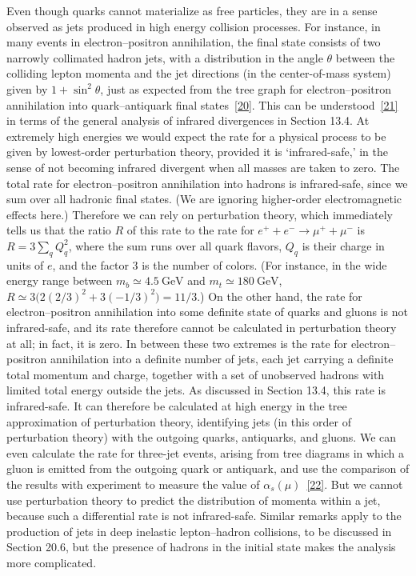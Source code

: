 Even though quarks cannot materialize as free particles, they are in a sense observed as jets produced in high energy collision processes. For instance, in many events in electron--positron annihilation, the final state consists of two narrowly collimated hadron jets, with a distribution in the angle $\theta$ between the colliding lepton momenta and the jet directions (in the center-of-mass system) given by $1+\sin^2\theta$, just as expected from the tree graph for electron--positron annihilation into quark--antiquark final states~\hyperref[ch18-ref-20]{[20]}. This can be understood~\hyperref[ch18-ref-21]{[21]} in terms of the general analysis of infrared divergences in Section 13.4. At extremely high energies we would expect the rate for a physical process to be given by lowest-order perturbation theory, provided it is `infrared-safe,' in the sense of not becoming infrared divergent when all masses are taken to zero. The total rate for electron--positron annihilation into hadrons is infrared-safe, since we sum over all hadronic final states. (We are ignoring higher-order electromagnetic effects here.) Therefore we can rely on perturbation theory, which immediately tells us that the ratio $R$ of this rate to the rate for $e^++e^-\to\mu^++\mu^-$ is $R=3\sum_q Q_q^2$, where the sum runs over all quark flavors, $Q_q$ is their charge in units of $e$, and the factor 3 is the number of colors. (For instance, in the wide energy range between $m_b\simeq4.5\ \mathrm{GeV}$ and $m_t\simeq180\ \mathrm{GeV}$, $R\simeq3\bigl(2(2/3)^2+3(-1/3)^2\bigr)=11/3$.) On the other hand, the rate for electron--positron annihilation into some definite state of quarks and gluons is not infrared-safe, and its rate therefore cannot be calculated in perturbation theory at all; in fact, it is zero. In between these two extremes is the rate for electron--positron annihilation into a definite number of jets, each jet carrying a definite total momentum and charge, together with a set of unobserved hadrons with limited total energy outside the jets. As discussed in Section 13.4, this rate is infrared-safe. It can therefore be calculated at high energy in the tree approximation of perturbation theory, identifying jets (in this order of perturbation theory) with the outgoing quarks, antiquarks, and gluons. We can even calculate the rate for three-jet events, arising from tree diagrams in which a gluon is emitted from the outgoing quark or antiquark, and use the comparison of the results with experiment to measure the value of $\alpha_s(\mu)$~\hyperref[ch18-ref-22]{[22]}. But we cannot use perturbation theory to predict the distribution of momenta within a jet, because such a differential rate is not infrared-safe. Similar remarks apply to the production of jets in deep inelastic lepton--hadron collisions, to be discussed in Section 20.6, but the presence of hadrons in the initial state makes the analysis more complicated.

